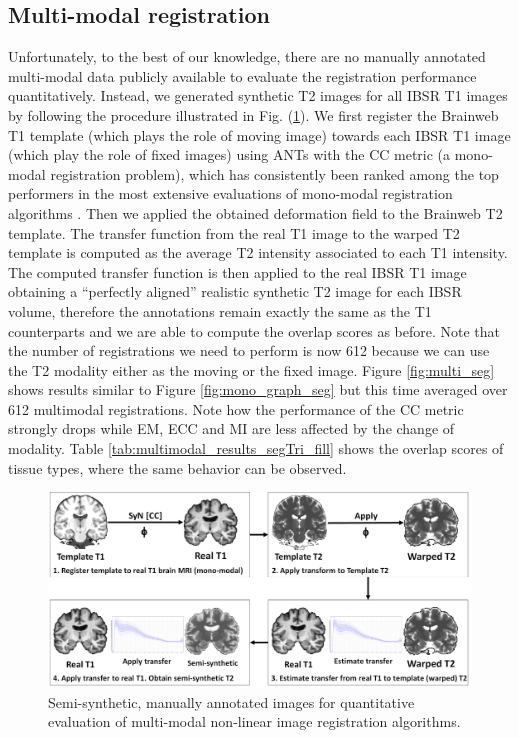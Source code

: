 \subsection{Multi-modal registration}\label{sec:multimodal_results}

Unfortunately, to the best of our knowledge, there are no manually annotated multi-modal data publicly available to evaluate the registration performance quantitatively. Instead, we generated synthetic T2 images for all IBSR T1 images by following the procedure illustrated in Fig. (\ref{fig:semi_synthetic_image_creation}). We first register the Brainweb T1 template (which plays the role of moving image) towards each IBSR T1 image (which play the role of fixed images) using ANTs with the CC metric (a mono-modal registration problem), which has consistently been ranked among the top performers in the most extensive evaluations of mono-modal registration algorithms \citep{Klein2009, Klein2010, Rohlfing2012}. Then we applied the obtained deformation field to the Brainweb T2 template. The transfer function from the real T1 image to the warped T2 template is computed as the average T2 intensity associated to each T1 intensity. The computed transfer function is then applied to the real IBSR T1 image obtaining a ``perfectly aligned'' realistic synthetic T2 image for each IBSR volume, therefore the annotations remain exactly the same as the T1 counterparts and we are able to compute the overlap scores as before. Note that the number of registrations we need to perform is now 612 because we can use the T2 modality either as the moving or the fixed image. Figure \ref{fig:multi_seg} shows results similar to Figure \ref{fig:mono_graph_seg} but this time averaged over 612 multimodal registrations. Note how the performance of the CC metric strongly drops while EM, ECC and MI are less affected by the change of modality. Table \ref{tab:multimodal_results_segTri_fill} shows the overlap scores of tissue types, where the same behavior can be observed.\\
\begin{figure}[H]
\centering
    \includegraphics[width=\linewidth]{./images/semi_synthetic_image_creation.png}
    \caption{Semi-synthetic, manually annotated images for quantitative evaluation of multi-modal non-linear image registration algorithms.}
\label{fig:semi_synthetic_image_creation}
\end{figure}

